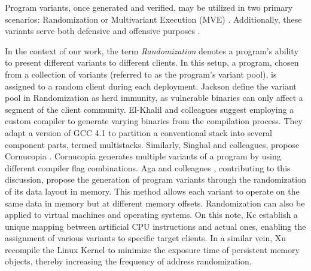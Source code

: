 Program variants, once generated and verified, may be utilized in two primary scenarios: Randomization or Multivariant Execution (MVE) \cite{jackson}. 
Additionally, these variants serve both defensive and offensive purposes \cite{offensive_div}.


In the context of our work, the term \emph{Randomization} denotes a program's ability to present different variants to different clients. 
In this setup, a program, chosen from a collection of variants (referred to as the program's variant pool), is assigned to a random client during each deployment. 
Jackson \etal \cite{jackson} define the variant pool in Randomization as herd immunity, as vulnerable binaries can only affect a segment of the client community. 
El-Khalil and colleagues \cite{ElKhalil2004} suggest employing a custom compiler to generate varying binaries from the compilation process. 
They adapt a version of GCC 4.1 to partition a conventional stack into several component parts, termed multistacks. 
Similarly, Singhal and colleagues, propose Cornucopia \cite{cornucopia}.
Cornucopia generates multiple variants of a program by using different compiler flag combinations.
Aga and colleagues \cite{aga2019smokestack}, contributing to this discussion, propose the generation of program variants through the randomization of its data layout in memory. 
This method allows each variant to operate on the same data in memory but at different memory offsets. 
Randomization can also be applied to virtual machines and operating systems. On this note, Kc \etal \cite{Kc03} establish a unique mapping between artificial CPU instructions and actual ones, enabling the assignment of various variants to specific target clients. 
In a similar vein, Xu \etal \cite{xu2020merr} recompile the Linux Kernel to minimize the exposure time of persistent memory objects, thereby increasing the frequency of address randomization.


